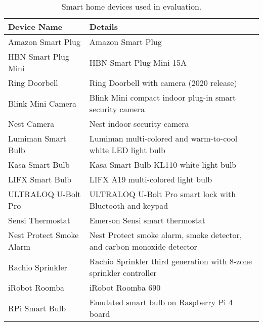 \begin{table}[t!]
        \scriptsize
	\centering
 \caption{Smart home devices used in \system{} evaluation.}
\begin{tabularx}{\linewidth}{p{26mm}p{48mm}} 
  \toprule
   \textbf{Device Name} & \textbf{Details} \\ 
  \midrule
   Amazon Smart Plug & Amazon Smart Plug \\ 
   HBN Smart Plug Mini & HBN Smart Plug Mini 15A \\ 
   Ring Doorbell & Ring Doorbell with camera (2020 release)\\ 
   Blink Mini Camera & Blink Mini compact indoor plug-in smart security camera \\ 
 Nest Camera & Nest indoor security camera \\ 
   Lumiman Smart Bulb & Lumiman multi-colored and warm-to-cool white LED light bulb\\ 
     Kasa Smart Bulb & Kasa Smart Bulb KL110 white light bulb \\ 
     LIFX Smart Bulb & LIFX A19 multi-colored light bulb \\ 
   ULTRALOQ U-Bolt Pro & ULTRALOQ U-Bolt Pro smart lock with Bluetooth and keypad\\ 
   Sensi Thermostat & Emerson Sensi smart thermostat \\ 
   Nest Protect Smoke Alarm & Nest Protect smoke alarm, smoke detector, and carbon monoxide detector\\ 
   Rachio Sprinkler & Rachio Sprinkler third generation with 8-zone sprinkler controller \\ 
   iRobot Roomba & iRobot Roomba 690 \\
  \midrule
     RPi Smart Bulb & Emulated smart bulb on Raspberry Pi 4 board \\ 
  \bottomrule
\end{tabularx}
\vspace{-1em}
\label{tab:device list}
\end{table}

